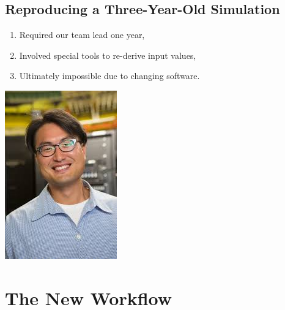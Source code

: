 \documentclass[11pt]{article}
\begin{document}
\subsection*{Reproducing a Three-Year-Old Simulation}
\label{sec:org6abd72c}
\begin{enumerate}
\item Required our team lead one year,
\item Involved special tools to re-derive input values,
\item Ultimately impossible due to changing software.
\end{enumerate}
\begin{center}
\includegraphics[width=.9\linewidth]{sung.jpg}
\end{center}
\section*{The New Workflow}
\label{sec:org6983df2}
\end{document}
